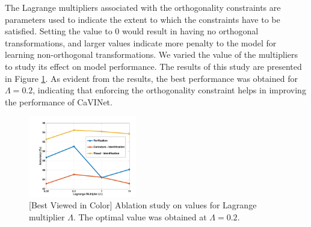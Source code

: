 \begin{table}[!h]
  \begin{center}
    
    \bigskip
    \caption{Ablation study on CaVINet with tied weights (TW), without the orthogonality constraints (w/o ortho) and learning only from the shared representations (shared features).}
    \label{table1}
  \end{center}
\end{table}

The Lagrange multipliers associated with the orthogonality constraints are parameters used to indicate the extent to which the constraints have to be satisfied. Setting the value to 0 would result in having no orthogonal transformations, and larger values indicate more penalty to the model for learning non-orthogonal transformations. We varied the value of the multipliers to study its effect on model performance. The results of this study are presented in Figure \ref{fig:lambda}.  As evident from the results, the best performance was obtained for $\Lambda = 0.2$, indicating that enforcing the orthogonality constraint helps in improving the performance of CaVINet.



\begin{figure}[h]
\centering
\includegraphics[width=0.42\textwidth]{images/lambda.png}
\caption{[Best Viewed in Color] Ablation study on values for Lagrange multiplier $\Lambda$. The optimal value was obtained at $\Lambda=0.2$.}
\label{fig:lambda}
\end{figure}


